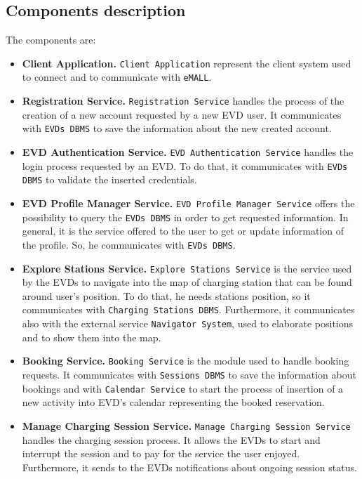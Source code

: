 \subsection{Components description}
\label{subsec:components_description}%
The components are:
\begin{itemize}
    \item \textbf{Client Application.} \verb|Client Application| represent the client system used to connect and to communicate
    with \verb|eMALL|.
    \item \textbf{Registration Service.} \verb|Registration Service| handles the process of the creation
    of a new account requested by a new EVD user.
    It communicates with \verb|EVDs DBMS| to save the information about the new created account.
    \item \textbf{EVD Authentication Service.} \verb|EVD Authentication Service| handles the login process requested by an EVD\@.
    To do that, it communicates with \verb|EVDs DBMS| to validate the inserted credentials.
    \item \textbf{EVD Profile Manager Service.} \verb|EVD Profile Manager Service| offers the possibility to query
    the \verb|EVDs DBMS| in order to get requested information.
    In general, it is the service offered to the user to get or update information of the profile.
    So, he communicates with \verb|EVDs DBMS|.
    \item \textbf{Explore Stations Service.} \verb|Explore Stations Service| is the service used by the EVDs to navigate
    into the map of charging station that can be found around user's position.
    To do that, he needs stations position, so it communicates with \verb|Charging Stations DBMS|.
    Furthermore, it communicates also with the external service \verb|Navigator System|, used to elaborate positions
    and to show them into the map.
    \item \textbf{Booking Service.} \verb|Booking Service| is the module used to handle booking requests.
    It communicates with \verb|Sessions DBMS| to save the information about bookings and with \verb|Calendar Service|
    to start the process of insertion of a new activity into EVD's calendar representing the booked reservation.
    \item \textbf{Manage Charging Session Service.} \verb|Manage Charging Session Service| handles the charging session process.
    It allows the EVDs to start and interrupt the session and to pay for the service the user enjoyed.
    Furthermore, it sends to the EVDs notifications about ongoing session status.

\end{itemize}
